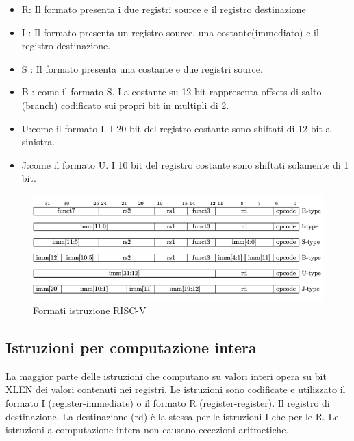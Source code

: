 \documentclass[12pt,a4paper]{report}
\begin{document}

\begin{itemize}
	\item R:  Il formato presenta i due registri source e il registro destinazione
	\item I : Il formato presenta un registro source, una costante(immediato) e il registro destinazione.
	\item S : Il formato presenta una costante e due registri source.
	\item B : come il formato S. La costante su 12 bit rappresenta offsets di salto (branch) codificato sui propri bit in multipli di 2.
	\item U:come il formato I. I 20 bit del registro costante sono shiftati di 12 bit a sinistra. 
	\item J:come  il formato U. I 10 bit del registro costante sono shiftati solamente di 1 bit. 
\end{itemize}

\begin{figure}
	\includegraphics[width = \textwidth]{FormatiIstruzione.png}
	\caption{Formati istruzione RISC-V}
	\label{Fig:Formati_istruzioni_RV32I}
\end{figure}

\subsection{Istruzioni per computazione intera}
La maggior parte delle istruzioni che computano su valori interi opera su bit XLEN dei valori contenuti nei registri. Le istruzioni sono codificate e utilizzato il formato I (register-immediate) o il formato R (register-register). Il registro di destinazione.  La destinazione (rd) è la stessa per le istruzioni I che per le R.  Le istruzioni a computazione intera non causano eccezioni aritmetiche.\\
\end{document}
